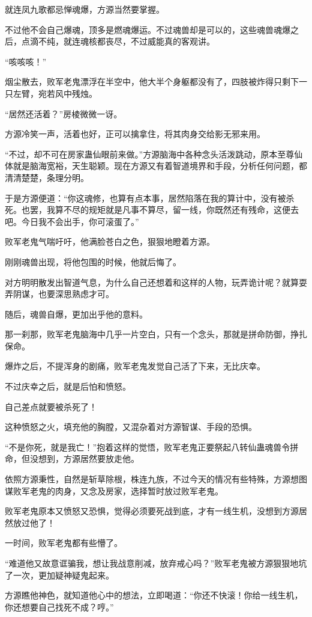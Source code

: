 \begin{this_body}
就连凤九歌都忌惮魂爆，方源当然要掌握。

不过他不会自己爆魂，顶多是燃魂爆运。不过魂兽却是可以的，这些魂兽魂爆之后，点滴不纯，就连魂核都丧尽，不过威能真的客观讲。

“咳咳咳！”

烟尘散去，败军老鬼漂浮在半空中，他大半个身躯都没有了，四肢被炸得只剩下一只左臂，宛若风中残烛。

“居然还活着？”房棱微微一讶。

方源冷笑一声，活着也好，正可以擒拿住，将其肉身交给影无邪来用。

“不过，却不可在房家蛊仙眼前来做。”方源脑海中各种念头活泼跳动，原本至尊仙体就是脑海宽裕，天生聪颖。现在方源又有着智道境界和手段，分析任何问题，都清清楚楚，条理分明。

于是方源便道：“你这魂修，也算有点本事，居然陷落在我的算计中，没有被杀死。也罢，我算不尽的规矩就是凡事不算尽，留一线，你既然还有残命，这便去吧。今日我不会出手，你可滚蛋了。”

败军老鬼气喘吁吁，他满脸苍白之色，狠狠地瞪着方源。

刚刚魂兽出现，将他包围的时候，他就后悔了。

对方明明散发出智道气息，为什么自己还想着和这样的人物，玩弄诡计呢？就算耍弄阴谋，也要深思熟虑才可。

随后，魂兽自爆，更加出乎他的意料。

那一刹那，败军老鬼脑海中几乎一片空白，只有一个念头，那就是拼命防御，挣扎保命。

爆炸之后，不提浑身的剧痛，败军老鬼发觉自己活了下来，无比庆幸。

不过庆幸之后，就是后怕和愤怒。

自己差点就要被杀死了！

这种愤怒之火，填充他的胸膛，又混杂着对方源智谋、手段的恐惧。

“不是你死，就是我亡！”抱着这样的觉悟，败军老鬼正要祭起八转仙蛊魂兽令拼命，但没想到，方源居然要放走他。

依照方源秉性，自然是斩草除根，株连九族，不过今天的情况有些特殊，方源想图谋败军老鬼的肉身，又念及房家，选择暂时放过败军老鬼。

败军老鬼原本又愤怒又恐惧，觉得必须要死战到底，才有一线生机，没想到方源居然放过他了！

一时间，败军老鬼都有些懵了。

“难道他又故意诓骗我，想让我战意削减，放弃戒心吗？”败军老鬼被方源狠狠地坑了一次，更加疑神疑鬼起来。

方源瞧他神色，就知道他心中的想法，立即喝道：“你还不快滚！你给一线生机，你还想要自己找死不成？哼。”


\end{this_body}
